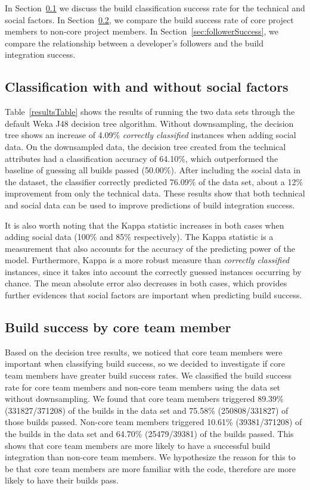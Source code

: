 \documentclass[10pt, conference]{IEEEtran}
\begin{document}
In Section~\ref{sec:successClassification} we discuss the build classification
success rate for the technical and social factors.  In Section~\ref{sec:core},
we compare the build success rate of core project members to non-core project
members.  In Section~\ref{sec:followerSuccess}, we compare the relationship
between a developer's followers and the build integration success.

\subsection{Classification with and without social factors}
\label{sec:successClassification}

Table~\ref{resultsTable} shows the results of running the two data sets through the
default Weka J48 decision tree algorithm.  Without downsampling, the 
decision tree shows an increase of 4.09\% \textit{correctly classified} instances when adding social data. On the downsampled data, the decision tree created from the technical attributes
had a classification accuracy of 64.10\%, which outperformed the baseline of
guessing all builds passed (50.00\%).
 After including the social data
in the dataset, the classifier correctly predicted 76.09\% of the data set,
about a 12\% improvement from only the technical data.  These results show that
both technical and social data can be used to improve predictions of build 
integration success.

It is also worth noting that the Kappa statistic increases in both cases when
adding social data (100\% and 85\% respectively). The Kappa statistic is a measurement that also accounts for the accuracy of the predicting power of the model. Furthermore, Kappa is a more 
robust measure than \textit{correctly classified} instances, since it takes into account the
correctly guessed instances occurring by chance. The mean absolute error also
decreases in both cases, which provides further evidences that social factors
are important when predicting build success.

\subsection{Build success by core team member}
\label{sec:core}


Based on the decision tree results, we noticed that core team members were
important when classifying build success, so we decided to investigate if core
team members have greater build success rates.
We classified the build success rate for
core team members and non-core team members using the data set without 
downsampling.  We found that core team members
triggered 89.39\% (331827/371208) of the builds in the data set and 75.58\%
(250808/331827) of those builds
passed.  Non-core team members triggered 10.61\% (39381/371208) of the builds 
in the data set
and 64.70\% (25479/39381) of the builds passed.  This shows that core team 
members are more
likely to have a successful build integration than non-core team members. We hypothesize the reason for this to be that core team members are more familiar with the code, therefore are more likely to have their builds pass.
\end{document}
